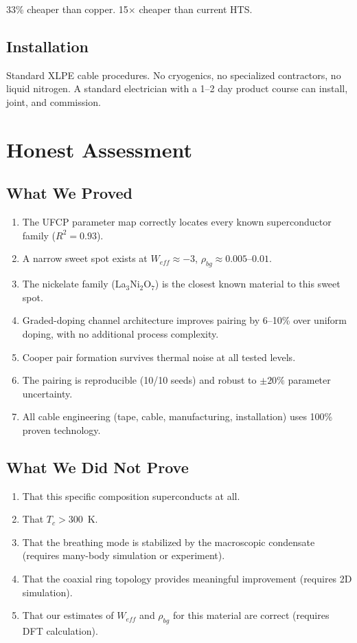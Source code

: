 \documentclass[11pt, a4paper]{article}
\begin{document}
33\% cheaper than copper. 15$\times$ cheaper than current HTS.

\subsection{Installation}

Standard XLPE cable procedures. No cryogenics, no specialized
contractors, no liquid nitrogen. A standard electrician with a
1--2 day product course can install, joint, and commission.

\section{Honest Assessment}
\label{sec:honest}

\subsection{What We Proved}

\begin{enumerate}[nosep]
  \item The UFCP parameter map correctly locates every known
        superconductor family ($R^2 = 0.93$).
  \item A narrow sweet spot exists at $W_{eff} \approx -3$,
        $\rho_{bg} \approx 0.005$--$0.01$.
  \item The nickelate family (La$_3$Ni$_2$O$_7$) is the closest
        known material to this sweet spot.
  \item Graded-doping channel architecture improves pairing by
        6--10\% over uniform doping, with no additional process
        complexity.
  \item Cooper pair formation survives thermal noise at all tested
        levels.
  \item The pairing is reproducible (10/10 seeds) and robust to
        $\pm 20\%$ parameter uncertainty.
  \item All cable engineering (tape, cable, manufacturing,
        installation) uses 100\% proven technology.
\end{enumerate}

\subsection{What We Did Not Prove}

\begin{enumerate}[nosep]
  \item That this specific composition superconducts at all.
  \item That $T_c > 300$~K.
  \item That the breathing mode is stabilized by the macroscopic
        condensate (requires many-body simulation or experiment).
  \item That the coaxial ring topology provides meaningful
        improvement (requires 2D simulation).
  \item That our estimates of $W_{eff}$ and $\rho_{bg}$ for this
        material are correct (requires DFT calculation).
\end{enumerate}
\end{document}
